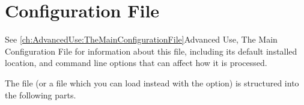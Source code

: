 
\chapter{Configuration File}
\label{ch:ConfigurationFile}
See \ref{ch:AdvancedUse:TheMainConfigurationFile}{Advanced Use, The
Main Configuration File} for information about this file, including its
default installed location, and command line options that can
affect how it is processed.


The file  (or a file which you can load instead with the  option) is structured into the following parts.

\section{}
\label{sec:config.ini:astro}

